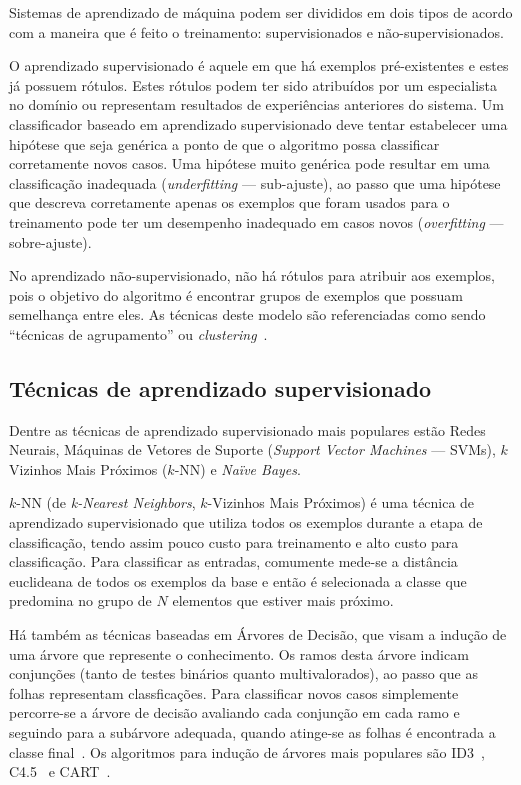 Sistemas de aprendizado de máquina podem ser divididos em dois tipos de acordo com a maneira que é feito o treinamento: supervisionados e não-supervisionados.

O aprendizado supervisionado é aquele em que há exemplos pré-existentes e estes já possuem rótulos. Estes rótulos podem ter sido atribuídos por um especialista no domínio ou representam resultados de experiências anteriores do sistema. Um classificador baseado em aprendizado supervisionado deve tentar estabelecer uma hipótese que seja genérica a ponto de que o algoritmo possa classificar corretamente novos casos. Uma hipótese muito genérica pode resultar em uma classificação inadequada (\emph{underfitting} --- sub-ajuste), ao passo que uma hipótese que descreva corretamente apenas os exemplos que foram usados para o treinamento pode ter um desempenho inadequado em casos novos (\emph{overfitting} --- sobre-ajuste).

No aprendizado não-supervisionado, não há rótulos para atribuir aos exemplos, pois o objetivo do algoritmo é encontrar grupos de exemplos que possuam semelhança entre eles. As técnicas deste modelo são referenciadas como sendo ``técnicas de agrupamento'' ou \emph{clustering}~\cite{rezende2003sistemas}.

\subsection{Técnicas de aprendizado supervisionado}

Dentre as técnicas de aprendizado supervisionado mais populares estão Redes Neurais, Máquinas de Vetores de Suporte (\emph{Support Vector Machines} --- SVMs), $k$ Vizinhos Mais Próximos ($k$-NN) e \emph{Naïve Bayes}.


$k$-NN (de \emph{k-Nearest Neighbors}, $k$-Vizinhos Mais Próximos) é uma técnica de aprendizado supervisionado que utiliza todos os exemplos durante a etapa de classificação, tendo assim pouco custo para treinamento e alto custo para classificação. Para classificar as entradas, comumente mede-se a distância euclideana de todos os exemplos da base e então é selecionada a classe que predomina no grupo de $N$ elementos que estiver mais próximo\cite{tan2006effective}.

Há também as técnicas baseadas em Árvores de Decisão, que visam a indução de uma árvore que represente o conhecimento. Os ramos desta árvore indicam conjunções (tanto de testes binários quanto multivalorados), ao passo que as folhas representam classficações. Para classificar novos casos simplemente percorre-se a árvore de decisão avaliando cada conjunção em cada ramo e seguindo para a subárvore adequada, quando atinge-se as folhas é encontrada a classe final~\cite{de-categorizacao}. Os algoritmos para indução de árvores mais populares são ID3~\cite{quinlan1986induction}, C4.5~\cite{quinlan1993programs} e CART~\cite{breiman1984classification}.

